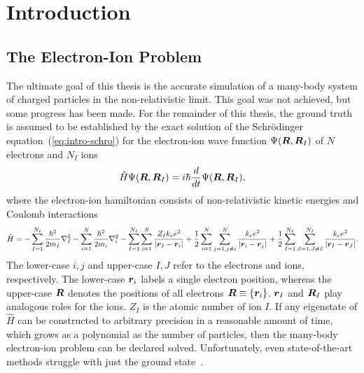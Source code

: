 \chapter{Introduction}

\section{The Electron-Ion Problem}
The ultimate goal of this thesis is the accurate simulation of a many-body system of charged particles in the non-relativistic limit.
This goal was not achieved, but some progress has been made.
For the remainder of this thesis, the ground truth is assumed to be established by the exact solution of the Schr\"odinger equation~(\ref{eq:intro-schro}) for the electron-ion wave function $\Psi(\boldsymbol{R},\boldsymbol{R}_I)$ of $N$ electrons and $N_I$ ions
\begin{align} \label{eq:intro-schro}
\hat{H} \Psi(\boldsymbol{R},\boldsymbol{R}_I) = i\hbar\frac{d}{dt}\Psi(\boldsymbol{R},\boldsymbol{R}_I),
\end{align}
where the electron-ion hamiltonian consists of non-relativistic kinetic energies and Coulomb interactions
\begin{align} \label{eq:intro-ei-ham}
\hat{H} =
-\sum\limits_{I=1}^{N_I} \frac{\hbar^2}{2m_I} \nabla^2_I
-\sum\limits_{i=1}^N \frac{\hbar^2}{2m_i}\nabla^2_i
-\sum\limits_{I=1}^{N_I}\sum\limits_{i=1}^N
\frac{Z_Ik_ee^2}{\vert\boldsymbol{r}_I-\boldsymbol{r}_i\vert}
+\frac{1}{2}\sum\limits_{i=1}^N\sum\limits_{j=1,j\neq i}^{N} \frac{k_ee^2}{\vert\boldsymbol{r}_i-\boldsymbol{r}_j\vert}
+\frac{1}{2}\sum\limits_{I=1}^{N_I}\sum\limits_{J=1,J\neq I}^{N_I} \frac{k_ee^2}{\vert\boldsymbol{r}_I-\boldsymbol{r}_J\vert}.
\end{align}
The lower-case $i,j$ and upper-case $I,J$ refer to the electrons and ions, respectively. The lower-case $\boldsymbol{r}_i$ labels a single electron position, whereas the upper-case $\boldsymbol{R}$ denotes the positions of all electrons $\boldsymbol{R}\equiv\{\boldsymbol{r}_i\}$. $\boldsymbol{r}_I$ and $\boldsymbol{R}_I$ play analogous roles for the ions. $Z_I$ is the atomic number of ion $I$. If any eigenstate of $\hat{H}$ can be constructed to arbitrary precision in a reasonable amount of time, which grows as a polynomial as the number of particles, then the many-body electron-ion problem can be declared solved. Unfortunately, even state-of-the-art methods struggle with just the ground state~\cite{Azadi2014,McMinis2015,Drummond2015}.

